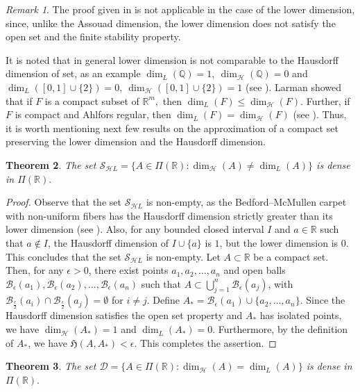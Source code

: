 \documentclass{amsproc}
\newtheorem{theorem}{Theorem}[section]
\theoremstyle{definition}
\theoremstyle{remark}
\newtheorem{remark}[theorem]{Remark}
\numberwithin{equation}{section}
\begin{document}
 \begin{remark}
The proof given in \cite[Theorem 3.8]{VAM} is not applicable in the case of the lower dimension, since, unlike the Assouad dimension, the lower dimension does not satisfy the open set and the finite stability property.
 \end{remark}
It is noted that in general lower dimension is not comparable to the Hausdorff dimension of set, as an example $\dim_L(\mathbb{Q})=1, ~\dim_\mathcal{H}(\mathbb{Q})=0$ and $\dim_L([0,1]\cup\{2\})=0, ~\dim_\mathcal{H}([0,1]\cup\{2\})=1$ (see \cite{Fraser}). Larman \cite{Larman} showed that if $F$ is a compact subset of $\mathbb{R}^m,$ then 
$\dim_L(F)\le \dim_{\mathcal{H}}(F).$ Further, if $F$ is compact and Ahlfors regular, then $\dim_L(F)=\dim_\mathcal{H}(F)$ (see \cite[Theorem 6.4.1]{Fraser}). Thus, it is worth mentioning next few results on the approximation of a compact set preserving the lower dimension and the Hausdorff dimension.  
 \begin{theorem}
    The set $\mathcal{S}_{\mathcal{H}L}=\{A\in\Pi(\mathbb{R}):\dim_\mathcal{H}(A)\ne\dim_L(A)\}$ is dense in $\Pi(\mathbb{R}).$ 
\end{theorem}
\begin{proof}
  Observe that the set $\mathcal{S}_{\mathcal{H}L}$ is non-empty, as the Bedford–McMullen carpet with non-uniform fibers has the Hausdorff dimension strictly greater than its lower dimension (see \cite[Theorem 2.1]{Fraser1}). Also, for any bounded closed interval $I$ and $a \in \mathbb{R}$ such that $a \notin I$, the Hausdorff dimension of $I \cup \{a\}$ is $1$, but the lower dimension is $0$. This concludes that the set $\mathcal{S}_{\mathcal{H}L}$ is non-empty.
Let $A \subset \mathbb{R}$ be a compact set. Then, for any $\epsilon > 0$, there exist points $a_1, a_2, \dots, a_n$ and open balls $\mathcal{B}_{\epsilon}(a_1), \mathcal{B}_{\epsilon}(a_2), \ldots, \mathcal{B}_{\epsilon}(a_n)$ such that $A \subset \bigcup_{j=1}^n \mathcal{B}_{\epsilon}(a_j)$, with $\mathcal{B}_{\frac{\epsilon}{2}}(a_i) \cap \mathcal{B}_{\frac{\epsilon}{2}}(a_j) = \emptyset$ for $i \neq j$. Define $A_* = \mathcal{B}_{\epsilon}(a_1) \cup \{a_2, \ldots, a_n\}$. Since the Hausdorff dimension satisfies the open set property and $A_*$ has isolated points, we have $\dim_\mathcal{H} (A_*) = 1$ and $\dim_L (A_*) = 0$. Furthermore, by the definition of $A_*$, we have $\mathfrak{H}(A, A_*) < \epsilon$. This completes the assertion.
 
\end{proof}
\begin{theorem}
    The set $\mathcal{D}=\{A\in\Pi(\mathbb{R}):\dim_\mathcal{H}(A) = \dim_L(A)\}$ is dense in $\Pi(\mathbb{R}).$ 
\end{theorem}
\end{document}
